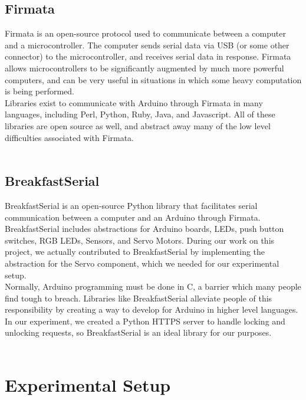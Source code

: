 \documentclass[twoside]{article}
\begin{document}
\begin{multicols}{2}
\subsection{Firmata}
    Firmata is an open-source protocol used to communicate between a computer and a microcontroller. The computer sends serial data via USB (or some other connector) to the microcontroller, and receives serial data in response. Firmata allows microcontrollers to be significantly augmented by much more powerful computers, and can be very useful in situations in which some heavy computation is being performed. \\
        Libraries exist to communicate with Arduino through Firmata in many languages, including Perl, Python, Ruby, Java, and Javascript. All of these libraries are open source as well, and abstract away many of the low level difficulties associated with Firmata. \\
\\

        \subsection{BreakfastSerial}
            BreakfastSerial is an open-source Python library that facilitates serial communication between a computer and an Arduino through Firmata. BreakfastSerial includes abstractions for Arduino boards, LEDs, push button switches, RGB LEDs, Sensors, and Servo Motors. During our work on this project, we actually contributed to BreakfastSerial by implementing the abstraction for the Servo component, which we needed for our experimental setup. \\
            Normally, Arduino programming must be done in C, a barrier which many people find tough to breach. Libraries like BreakfastSerial alleviate people of this responsibility by creating a way to develop for Arduino in higher level languages. In our experiment, we created a Python HTTPS server to handle locking and unlocking requests, so BreakfastSerial is an ideal library for our purposes. \\
\\
            \section{Experimental Setup}


\end{multicols}
\end{document}
